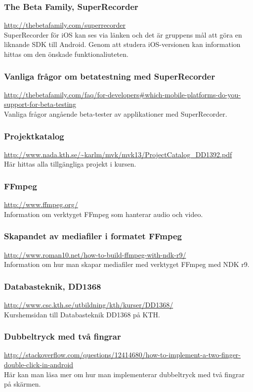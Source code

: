 \subsubsection{The Beta Family, SuperRecorder}
\url{http://thebetafamily.com/superrecorder} \\
SuperRecorder för iOS kan ses via länken och det är gruppens mål att göra en liknande SDK till Android. Genom att studera iOS-versionen kan information hittas om den önskade funktionaliuteten.

\subsubsection{Vanliga frågor om betatestning med SuperRecorder}
\url{http://thebetafamily.com/faq/for-developers\#which-mobile-platforms-do-you-support-for-beta-testing} \\
Vanliga frågor angående beta-tester av applikationer med SuperRecorder.

\subsubsection{Projektkatalog}
\url{http://www.nada.kth.se/~karlm/mvk/mvk13/ProjectCatalog_DD1392.pdf} \\
Här hittas alla tillgängliga projekt i kursen.

\subsubsection{FFmpeg}
\url{http://www.ffmpeg.org/} \\
Information om verktyget FFmpeg som hanterar audio och video.

\subsubsection{Skapandet av mediafiler i formatet FFmpeg}
\url{http://www.roman10.net/how-to-build-ffmpeg-with-ndk-r9/} \\
Information om hur man skapar mediafiler med verktyget FFmpeg med NDK r9.

\subsubsection{Databasteknik, DD1368}
\url{http://www.csc.kth.se/utbildning/kth/kurser/DD1368/} \\
Kurshemsidan till Databasteknik DD1368 på KTH.

\subsubsection{Dubbeltryck med två fingrar}
\url{http://stackoverflow.com/questions/12414680/how-to-implement-a-two-finger-double-click-in-android} \\
Här kan man läsa mer om hur man implementerar dubbeltryck med två fingrar på skärmen.

